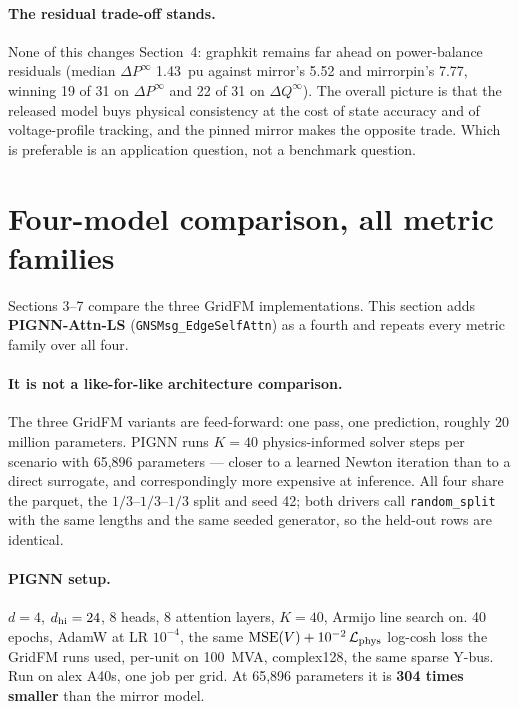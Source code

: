 \documentclass[10pt]{article}
\begin{document}
\paragraph{The residual trade-off stands.} None of this changes Section~4:
graphkit remains far ahead on power-balance residuals (median
$\Delta P^{\infty}$ 1.43~pu against mirror's 5.52 and mirrorpin's 7.77, winning
19 of 31 on $\Delta P^{\infty}$ and 22 of 31 on $\Delta Q^{\infty}$). The
overall picture is that the released model buys physical consistency at the cost
of state accuracy and of voltage-profile tracking, and the pinned mirror makes
the opposite trade. Which is preferable is an application question, not a
benchmark question.

\section{Four-model comparison, all metric families}
\label{sec:fourmodel}

Sections 3--7 compare the three GridFM implementations. This section adds
\textbf{PIGNN-Attn-LS} (\texttt{GNSMsg\_EdgeSelfAttn}) as a fourth and repeats
every metric family over all four.

\paragraph{It is not a like-for-like architecture comparison.} The three GridFM
variants are feed-forward: one pass, one prediction, roughly 20 million
parameters. PIGNN runs $K=40$ physics-informed solver steps per scenario with
65{,}896 parameters --- closer to a learned Newton iteration than to a direct
surrogate, and correspondingly more expensive at inference. All four share the
parquet, the $1/3$--$1/3$--$1/3$ split and seed 42; both drivers call
\texttt{random\_split} with the same lengths and the same seeded generator, so
the held-out rows are identical.

\paragraph{PIGNN setup.} $d=4$, $d_{\rm hi}=24$, 8 heads, 8 attention layers,
$K=40$, Armijo line search on. 40 epochs, AdamW at LR $10^{-4}$, the same
$\mathrm{MSE}(V) + 10^{-2}\,\mathcal{L}_{\rm phys}$ log-cosh loss the GridFM runs
used, per-unit on 100~MVA, complex128, the same sparse Y-bus. Run on alex A40s,
one job per grid. At 65{,}896 parameters it is \textbf{304 times smaller} than
the mirror model.
\end{document}
